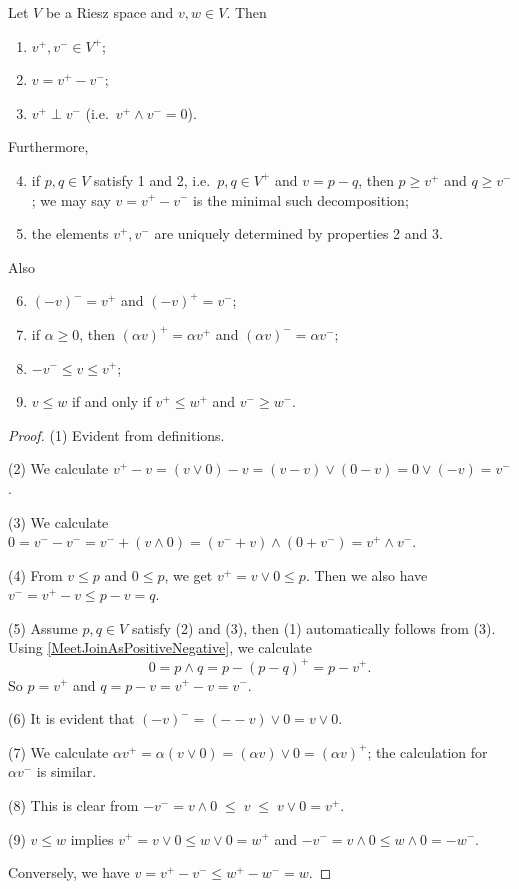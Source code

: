 \begin{proposition} \label{PositiveNegativeElements} \label{minimalPositiveDecomposition} 
Let $V$ be a Riesz space and $v,w\in V$. Then
\begin{enumerate}
\item $v^+, v^- \in V^+$;
\item $v= v^+ - v^-$;
\item $v^+\perp v^-$ (i.e.\ $v^+ \wedge v^- = 0$).
\end{enumerate}
Furthermore,
\begin{enumerate} \setcounter{enumi}{3}
\item if $p,q\in V$ satisfy 1 and 2, i.e.\ $p,q\in V^+$ and $v = p-q$, then $p \geq v^+$ and $q \geq v^-$; we may say $v=v^+-v^-$ is the minimal such decomposition; 
\item the elements $v^+, v^-$ are uniquely determined by properties 2 and 3. 
\end{enumerate}
Also
\begin{enumerate} \setcounter{enumi}{5}
\item $(-v)^- = v^+$ and $(-v)^+ = v^-$;
\item if $\alpha \geq 0$, then $(\alpha v)^+ = \alpha v^+$ and $(\alpha v)^- = \alpha v^-$;
\item $-v^- \leq v \leq v^+$;
\item $v\leq w$ \textup{if and only if} $v^+ \leq w^+$ and $v^- \geq w^-$.
\end{enumerate}
\end{proposition}
\begin{proof}
(1) Evident from definitions.

(2) We calculate $v^+ - v = (v \vee 0) - v = (v-v) \vee (0-v) = 0\vee (-v) = v^-$.

(3) We calculate $0 = v^- - v^- = v^-  + (v\wedge 0) = (v^- + v)\wedge (0 + v^-) = v^+ \wedge v^-$.

(4) From $v\leq p$ and $0\leq p$, we get $v^+ = v \vee 0 \leq p$. Then we also have $v^- = v^+ - v \leq p - v = q$.

(5) Assume $p,q\in V$ satisfy (2) and (3), then (1) automatically follows from (3). Using \ref{MeetJoinAsPositiveNegative}, we calculate
\[ 0 = p\wedge q = p - (p-q)^+ = p - v^+. \]
So $p = v^+$ and $q = p - v = v^+ - v = v^-$.

(6) It is evident that $(-v)^- = (--v)\vee 0 = v\vee 0$.

(7) We calculate $\alpha v^+ = \alpha (v \vee 0) = (\alpha v) \vee 0 = (\alpha v)^+$; the calculation for $\alpha v^-$ is similar.

(8) This is clear from $-v^- = v\wedge 0 \;\leq\; v \;\leq\; v \vee 0 = v^+$.

(9) $v\leq w$ implies $v^+ = v\vee 0 \leq w\vee 0 = w^+$ and $-v^- = v\wedge 0 \leq w\wedge 0 = - w^-$.

Conversely, we have $v = v^+ - v^- \leq w^+ - w^- = w$.
\end{proof}


